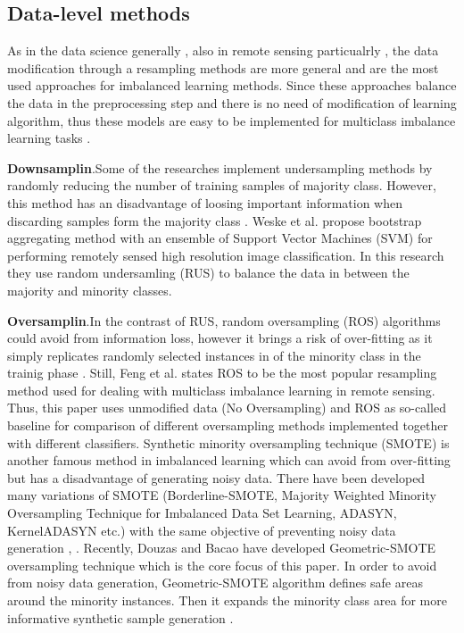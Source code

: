 \documentclass[parskip=full]{scrartcl}
\begin{document}
\subsection{Data-level methods}
As in the data science generally \citep{douzas2019geometric}, also in remote sensing particualrly  \citep{feng2019imbalanced}, the data modification through a resampling methods are more general and are the most used approaches for imbalanced learning methods. Since these approaches balance the data in the preprocessing step and there is no need of modification of learning algorithm, thus these models are easy to be implemented for multiclass imbalance learning tasks  \citep{feng2019imbalanced}. 

\textbf{Downsamplin}.Some of the researches implement undersampling methods by randomly reducing the number of training samples of majority class. However, this method has an disadvantage of loosing important information when discarding samples form the majority class \citep{feng2019imbalanced}.  Weske et al. \citep{waske2009classifying} propose bootstrap aggregating method with an ensemble of Support Vector Machines (SVM) for performing remotely sensed high resolution image classification. In this research they use random undersamling (RUS) to balance the data in between the majority and minority classes.

\textbf{Oversamplin}.In the contrast of RUS, random oversampling (ROS) algorithms could avoid from information loss, however it brings a risk of over-fitting as it simply replicates randomly selected instances in of the minority class in the trainig phase \citep{douzas2019geometric}. Still, Feng et al. \citep{feng2019imbalanced} states ROS to be the most popular resampling method used for dealing with multiclass imbalance learning in remote sensing. Thus, this paper uses unmodified data (No Oversampling) and ROS as so-called baseline for comparison of different oversampling methods implemented together with different classifiers. Synthetic minority oversampling technique (SMOTE) is another famous method in imbalanced learning which can avoid from over-fitting but has a disadvantage of generating noisy data. There have been developed many variations of SMOTE (Borderline-SMOTE, Majority Weighted Minority Oversampling Technique for Imbalanced Data Set Learning, ADASYN, KernelADASYN etc.) with the same objective of preventing noisy data generation \citep{douzas2019geometric}, \citep{feng2019imbalanced}. Recently, Douzas and Bacao have developed Geometric-SMOTE oversampling technique which is the core focus of this paper. In order to avoid from noisy data generation, Geometric-SMOTE algorithm defines safe areas around the minority instances. Then it expands the minority class area for more informative synthetic sample generation \citep{douzas2019geometric}. 
\end{document}
